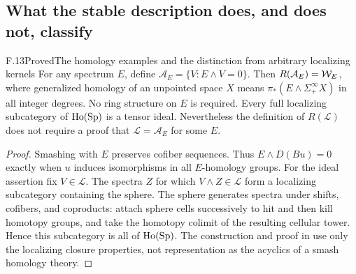 \subsection{What the stable description does, and does not, classify}

\begin{claim}{F.13}{Proved}{The homology examples and the distinction from arbitrary localizing kernels}
For any spectrum $E$, define
$\mathcal A_E=\{V:E\wedge V=0\}$. Then
$R(\mathcal A_E)=\mathcal{W}_E$, where generalized homology of an unpointed
space $X$ means $\pi_*(E\wedge\Sigma^\infty_+X)$ in all integer
degrees. No ring structure on $E$ is required. Every full localizing
subcategory of $\operatorname{Ho}(\mathrm{Sp})$ is a tensor ideal. Nevertheless the
definition of $R(\mathcal L)$ does not require a proof that
$\mathcal L=\mathcal A_E$ for some $E$.
\end{claim}
\begin{proof}
Smashing with $E$ preserves cofiber sequences. Thus
$E\wedge D(Bu)=0$ exactly when $u$ induces isomorphisms in all
$E$-homology groups. For the ideal assertion fix $V\in\mathcal L$.
The spectra $Z$ for which $V\wedge Z\in\mathcal L$ form a localizing
subcategory containing the sphere. The sphere generates spectra under
shifts, cofibers, and coproducts: attach sphere cells successively to
hit and then kill homotopy groups, and take the homotopy colimit of the
resulting cellular tower. Hence this subcategory is all of $\operatorname{Ho}(\mathrm{Sp})$.
The construction and proof in  use only the localizing
closure properties, not representation as the acyclics of a smash
homology theory.
\end{proof}

